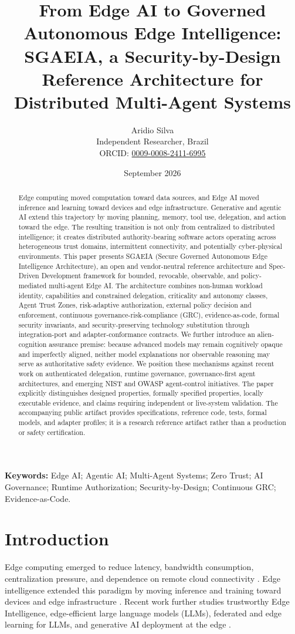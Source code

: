 \documentclass[11pt]{article}
\title{From Edge AI to Governed Autonomous Edge Intelligence:\\
SGAEIA, a Security-by-Design Reference Architecture for Distributed Multi-Agent Systems}
\author{Aridio Silva\\
Independent Researcher, Brazil\\
ORCID: \href{https://orcid.org/0009-0008-2411-6995}{0009-0008-2411-6995}}
\date{September 2026}
\newcommand{\sgaeia}{\textsc{SGAEIA}}
\begin{document}
\maketitle

\begin{abstract}
Edge computing moved computation toward data sources, and Edge AI moved inference and learning toward devices and edge infrastructure. Generative and agentic AI extend this trajectory by moving planning, memory, tool use, delegation, and action toward the edge. The resulting transition is not only from centralized to distributed intelligence; it creates distributed authority-bearing software actors operating across heterogeneous trust domains, intermittent connectivity, and potentially cyber-physical environments. This paper presents \sgaeia{} (Secure Governed Autonomous Edge Intelligence Architecture), an open and vendor-neutral reference architecture and Spec-Driven Development framework for bounded, revocable, observable, and policy-mediated multi-agent Edge AI. The architecture combines non-human workload identity, capabilities and constrained delegation, criticality and autonomy classes, Agent Trust Zones, risk-adaptive authorization, external policy decision and enforcement, continuous governance-risk-compliance (GRC), evidence-as-code, formal security invariants, and security-preserving technology substitution through integration-port and adapter-conformance contracts. We further introduce an alien-cognition assurance premise: because advanced models may remain cognitively opaque and imperfectly aligned, neither model explanations nor observable reasoning may serve as authoritative safety evidence. We position these mechanisms against recent work on authenticated delegation, runtime governance, governance-first agent architectures, and emerging NIST and OWASP agent-control initiatives. The paper explicitly distinguishes designed properties, formally specified properties, locally executable evidence, and claims requiring independent or live-system validation. The accompanying public artifact provides specifications, reference code, tests, formal models, and adapter profiles; it is a research reference artifact rather than a production or safety certification.
\end{abstract}

\noindent\textbf{Keywords:} Edge AI; Agentic AI; Multi-Agent Systems; Zero Trust; AI Governance; Runtime Authorization; Security-by-Design; Continuous GRC; Evidence-as-Code.

\section{Introduction}
Edge computing emerged to reduce latency, bandwidth consumption, centralization pressure, and dependence on remote cloud connectivity \cite{shi2016edge}. Edge intelligence extended this paradigm by moving inference and training toward devices and edge infrastructure \cite{zhou2019edge,li2018edge}. Recent work further studies trustworthy Edge Intelligence, edge-efficient large language models (LLMs), federated and edge learning for LLMs, and generative AI deployment at the edge \cite{wang2025trustworthyedge,wang2025edgeefficientllm,piccialli2025federatededge,navardi2025genaiedge}.
\end{document}
